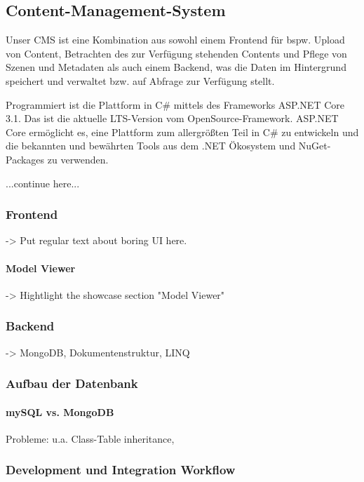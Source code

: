\documentclass[titlepage, a4paper, 11pt]{scrartcl}
\begin{document}
    \subsection{Content-Management-System}

      Unser CMS ist eine Kombination aus sowohl einem Frontend für bspw. Upload von Content, Betrachten des zur Verfügung stehenden Contents und Pflege von Szenen und Metadaten 
      als auch einem Backend, was die Daten im Hintergrund speichert und verwaltet bzw. auf Abfrage zur Verfügung stellt.

      Programmiert ist die Plattform in C# mittels des Frameworks ASP.NET Core 3.1. Das ist die aktuelle LTS-Version vom OpenSource-Framework.
      ASP.NET Core ermöglicht es, eine Plattform zum allergrößten Teil in C# zu entwickeln und die bekannten und bewährten Tools aus dem .NET Ökosystem und NuGet-Packages zu verwenden.

      ...continue here...

      \subsubsection{Frontend}

        -> Put regular text about boring UI here.
        
        \paragraph{Model Viewer}

          -> Hightlight the showcase section "Model Viewer"

      \subsubsection{Backend}

        -> MongoDB, Dokumentenstruktur, LINQ

      \subsubsection{Aufbau der Datenbank}

        \paragraph{mySQL vs. MongoDB}

        Probleme: u.a. Class-Table inheritance, 

      \subsubsection{Development und Integration Workflow}
\end{document}
